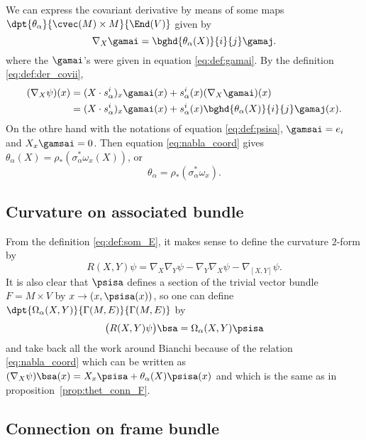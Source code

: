 We can express the covariant derivative by means of some maps $\dpt{\theta_{\alpha}}{\cvec(M)\times M}{\End(V)}$ given by
 \begin{equation}
\nabla_X\gamai=\bghd{\theta_{\alpha}(X)}{i}{j}\gamaj.
 \end{equation}
where the $\gamai$'s were given in equation \eqref{eq:def:gamai}. By the definition \eqref{eq:def:der_covii},
\[
\begin{split}
  (\nabla_X\psi)(x)&=(X\cdot s^i_{\alpha})_x\gamai(x)+s^i_{\alpha}(x)(\nabla_X\gamai)(x)\\
                   &=(X\cdot s^i_{\alpha})_x\gamai(x)+s^i_{\alpha}(x)\bghd{\theta_{\alpha}(X)}{i}{j}\gamaj(x).
\end{split}
\]
On the othre hand with the notations of equation \eqref{eq:def:psisa}, $\gamsai=e_i$ and $X_x\gamsai=0$. Then equation \eqref{eq:nabla_coord} gives $\theta_{\alpha}(X)=\rho_*(\sigma_{\alpha}^*\omega_x(X))$, or
\begin{equation}
\theta_{\alpha}=\rho_*(\sigma^*_{\alpha}\omega_x).
\end{equation}

\subsection{Curvature on associated bundle}

From the definition \eqref{eq:def:som_E}, it makes sense to define the curvature $2$-form by
\[
  R(X,Y)\psi=\nabla_X\nabla_Y\psi-\nabla_Y\nabla_X\psi-\nabla_{[X,Y]}\psi.
\]
It is also clear that $\psisa$ defines a section of the trivial vector bundle $F=M\times V$ by $x\to (x,\psisa(x))$, so one can define  $\dpt{\Omega_{\alpha}(X,Y)}{\Gamma(M,E)}{\Gamma(M,E)}$ by
\[
  \big(  R(X,Y)\psi  \big)\bsa=\Omega_{\alpha}(X,Y)\psisa
\]
and take back all the work around Bianchi because of the relation \eqref{eq:nabla_coord} which can be written as $(\nabla_X\psi)\bsa(x)=X_x\psisa+\theta_{\alpha}(X)\psisa(x)$ and which is the same as in proposition~\ref{prop:thet_conn_F}.

\subsection{Connection on frame bundle}

